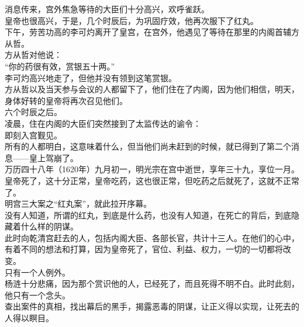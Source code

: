 \begin{multicols}{\theparacolNo}
消息传来，宫外焦急等待的大臣们十分高兴，欢呼雀跃。\\

皇帝也很高兴，于是，几个时辰后，为巩固疗效，他再次服下了红丸。\\

下午，劳苦功高的李可灼离开了皇宫，在宫外，他遇见了等待在那里的内阁首辅方从哲。\\

方从哲对他说：\\

“你的药很有效，赏银五十两。”\\

李可灼高兴地走了，但他并没有领到这笔赏银。\\

方从哲以及当天参与会议的人都留下了，他们住在了内阁，因为他们相信，明天，身体好转的皇帝将再次召见他们。\\

六个时辰之后。\\

凌晨，住在内阁的大臣们突然接到了太监传达的谕令：\\

即刻入宫觐见。\\

所有的人都明白，这意味着什么，但当他们尚未赶到的时候，就已得到了第二个消息——皇上驾崩了。\\

万历四十八年（1620年）九月初一，明光宗在宫中逝世，享年三十九，享位一月。\\

皇帝死了，这十分正常，皇帝吃药，这也很正常，但吃药之后就死了，这就不正常了。\\

明宫三大案之“红丸案”，就此拉开序幕。\\

没有人知道，所谓的红丸，到底是什么药，也没有人知道，在死亡的背后，到底隐藏着什么样的阴谋。\\

此时向乾清宫赶去的人，包括内阁大臣、各部长官，共计十三人。在他们的心中，有着不同的想法和打算，因为皇帝死了，官位、利益、权力，一切的一切都将改变。\\

只有一个人例外。\\

杨涟十分悲痛，因为那个赏识他的人，已经死了，而且死得不明不白。此时此刻，他只有一个念头。\\

查出案件的真相，找出幕后的黑手，揭露恶毒的阴谋，让正义得以实现，让死去的人得以瞑目。\\


\end{multicols}
